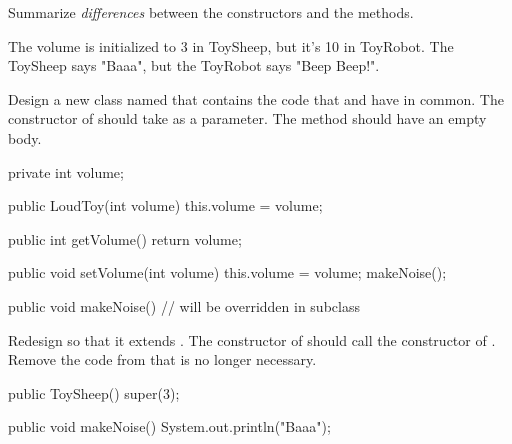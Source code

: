\Q Summarize \emph{differences} between the constructors and the  methods.

\begin{answer}
The volume is initialized to 3 in ToySheep, but it's 10 in ToyRobot.
The ToySheep says "Baaa", but the ToyRobot says "Beep Beep!".
\end{answer}


\Q \label{LoudToyV1}
Design a new class named  that contains the code that  and  have in common.
The constructor of  should take  as a parameter.
The  method should have an empty body.

\begin{javalst}
public class LoudToy {
\end{javalst}
\vspace{-1ex}
\begin{answer}[25em]
\begin{javaans}
    private int volume;

    public LoudToy(int volume) {
        this.volume = volume;
    }

    public int getVolume() {
        return volume;
    }

    public void setVolume(int volume) {
        this.volume = volume;
        makeNoise();
    }

    public void makeNoise() {
        // will be overridden in subclass
    }
\end{javaans}
\end{answer}
\vspace{-1ex}
\begin{javalst}
}
\end{javalst}


\Q Redesign  so that it extends .
The constructor of  should call the constructor of .
Remove the code from  that is no longer necessary.

\begin{javalst}
public class ToySheep extends LoudToy {
\end{javalst}
\vspace{-1ex}
\begin{answer}[12em]
\begin{javaans}
    public ToySheep() {
        super(3);
    }

    public void makeNoise() {
        System.out.println("Baaa");
    }
\end{javaans}
\end{answer}
\vspace{-1ex}
\begin{javalst}
}
\end{javalst}


